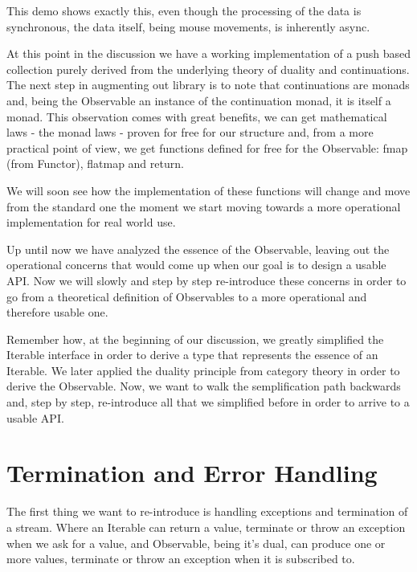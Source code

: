 This demo shows exactly this, even though the processing of the data is synchronous, the data itself, being mouse movements, is inherently async.

At this point in the discussion we have a working implementation of a push based collection purely derived from the underlying theory of duality and continuations. The next step in augmenting out library is to note that continuations are monads and, being the Observable an instance of the continuation monad, it is itself a monad. This observation comes with great benefits, we can get mathematical laws - the monad laws - proven for free for our structure and, from a more practical point of view, we get functions defined for free for the Observable: fmap (from Functor), flatmap and return.


We will soon see how the implementation of these functions will change and move from the standard one the moment we start moving towards a more operational implementation for real world use.




Up until now we have analyzed the essence of the Observable, leaving out the operational concerns that would come up when our goal is to design a usable API. Now we will slowly and step by step re-introduce these concerns in order to go from a theoretical definition of Observables to a more operational and therefore usable one.

Remember how, at the beginning of our discussion, we greatly simplified the Iterable interface in order to derive a type that represents the essence of an Iterable. We later applied the duality principle from category theory in order to derive the Observable. Now, we want to walk the semplification path backwards and, step by step, re-introduce all that we simplified before in order to arrive to a usable API.

\section{Termination and Error Handling}


The first thing we want to re-introduce is handling exceptions and termination of a stream. Where an Iterable can return a value, terminate or throw an exception when we ask for a value, and Observable, being it's dual, can produce one or more values, terminate or throw an exception when it is subscribed to. 

